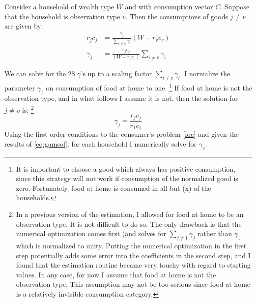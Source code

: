\documentclass{article}
\begin{document}
Consider a household of wealth type $W$ and with consumption vector $C$.  
Suppose that the household is observation type $v$.
Then the consumptions of goods $j\neq v$ are given by:
\begin{align}
	\label{eq:sgd}
	r_jc_j &= \frac{\gamma_j}{\sum_{i\neq v}\gamma_i}  \left(W-  r_v c_v\right)\\
	\label{eq:sgdsol}
	\gamma_j &= \frac{r_j c_j}{\left(W- r_v c_v\right)} \sum_{i\neq v}\gamma_i  
\end{align}

We can solve for the 28 $\gamma$'s up to a scaling factor $\sum_{i\neq v}\gamma_i$.
I normalize the parameter $\gamma_1$ on consumption of food at home to one. 
\footnote{It is important to choose a good which always has positive consumption, since this strategy will not work if consumption of the normalized good is zero.  
Fortunately, food at home is consumed in all but (x) of the households.}
If food at home is not the observation type, and in what follows I assume it is not, then the solution for $j \neq v$ is:
\footnote{In a previous version of the estimation, I allowed for food at home to be an observation type.
It is not difficult to do so.
The only drawback is that the numerical optimization comes first (and solves for $\sum_{j \neq 1} \gamma_j$ rather than $\gamma_1$ which is normalized to unity.  
Putting the numerical optimization in the first step potentially adds some error into the coefficients in the second step, and I found that the estimation routine became very touchy with regard to starting values.
In any case, for now I assume that food at home is not the observation type.
This assumption may not be too serious since food at home is a relatively invisible consumption category.
}
\begin{equation}
	\label{eq:gamsol}
	\gamma_j = \frac{r_j c_j}{r_1 c_1}
\end{equation}
Using the first order conditions to the consumer's problem \eqref{foc} and given the results of \eqref{eq:gamsol}, for each household I numerically solve for  $\gamma_v$.
\end{document}
